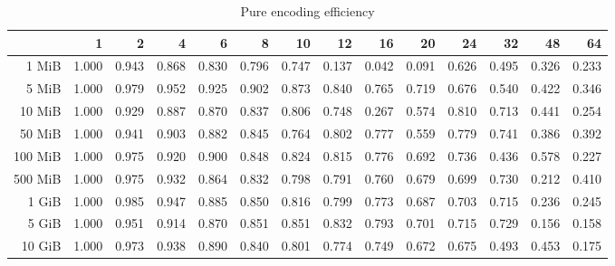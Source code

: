 \begin{table}[!h]
	\centering
	\caption{Pure encoding efficiency}
	\begin{tabular}{rrrrrrrrrrrrrr}
		\toprule
		\diagbox[width=7em]{Size}{Threads} &    1  &    2  &    4  &    6  &    8  &    10 &    12 &    16 &    20 &    24 &    32 &    48 &    64 \\
		\midrule
		1 MiB   & 1.000 & 0.943 & 0.868 & 0.830 & 0.796 & 0.747 & 0.137 & 0.042 & 0.091 & 0.626 & 0.495 & 0.326 & 0.233 \\
		5 MiB   & 1.000 & 0.979 & 0.952 & 0.925 & 0.902 & 0.873 & 0.840 & 0.765 & 0.719 & 0.676 & 0.540 & 0.422 & 0.346 \\
		10 MiB  & 1.000 & 0.929 & 0.887 & 0.870 & 0.837 & 0.806 & 0.748 & 0.267 & 0.574 & 0.810 & 0.713 & 0.441 & 0.254 \\
		50 MiB  & 1.000 & 0.941 & 0.903 & 0.882 & 0.845 & 0.764 & 0.802 & 0.777 & 0.559 & 0.779 & 0.741 & 0.386 & 0.392 \\
		100 MiB & 1.000 & 0.975 & 0.920 & 0.900 & 0.848 & 0.824 & 0.815 & 0.776 & 0.692 & 0.736 & 0.436 & 0.578 & 0.227 \\
		500 MiB & 1.000 & 0.975 & 0.932 & 0.864 & 0.832 & 0.798 & 0.791 & 0.760 & 0.679 & 0.699 & 0.730 & 0.212 & 0.410 \\
		1 GiB   & 1.000 & 0.985 & 0.947 & 0.885 & 0.850 & 0.816 & 0.799 & 0.773 & 0.687 & 0.703 & 0.715 & 0.236 & 0.245 \\
		5 GiB   & 1.000 & 0.951 & 0.914 & 0.870 & 0.851 & 0.851 & 0.832 & 0.793 & 0.701 & 0.715 & 0.729 & 0.156 & 0.158 \\
		10 GiB  & 1.000 & 0.973 & 0.938 & 0.890 & 0.840 & 0.801 & 0.774 & 0.749 & 0.672 & 0.675 & 0.493 & 0.453 & 0.175 \\
		\bottomrule
	\end{tabular}
\end{table}
